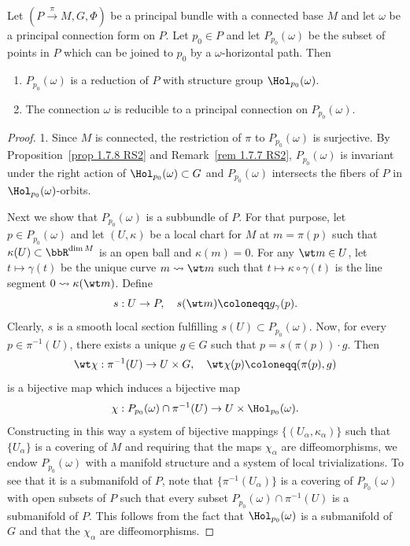 \begin{prop}[{{\cite[Prop.~1.7.12]{RS2}}}]\label{prop 1.7.12 RS2}
    Let $(P\overset{\pi}{\to}M,G,\Phi)$ be a principal bundle with a connected base $M$ and let $\omega$ be a principal connection form on $P$. Let $p_0\in P$ and let $P_{p_0}(\omega)$ be the subset of points in $P$ which can be joined to $p_0$ by a $\omega$-horizontal path. Then
    \begin{enumerate}
        \item $P_{p_0}(\omega)$ is a reduction of $P$ with structure group $\Hol_{p_0}(\omega)$.
        \item The connection $\omega$ is reducible to a principal connection on $P_{p_0}(\omega)$.
    \end{enumerate}
\end{prop}
\begin{proof}
    1. Since $M$ is connected, the restriction of $\pi$ to $P_{p_0}(\omega)$ is surjective. By Proposition~\ref{prop 1.7.8 RS2} and Remark~\ref{rem 1.7.7 RS2}, $P_{p_0}(\omega)$ is invariant under the right action of $\Hol_{p_0}(\omega)\subset G$ and $P_{p_0}(\omega)$ intersects the fibers of $P$ in $\Hol_{p_0}(\omega)$-orbits.

    Next we show that $P_{p_0}(\omega)$ is a subbundle of $P$. For that purpose, let $p\in P_{p_0}(\omega)$ and let $(U,\kappa)$ be a local chart for $M$ at $m=\pi(p)$ such that $\kappa(U)\subset\bbR^{\dim M}$ is an open ball and $\kappa(m)=0$. For any $\wt m\in U$, let $t\mapsto \gamma(t)$ be the unique curve  $m\leadsto \wt m$ such that $t\mapsto \kappa\circ\gamma(t)$ is the line segment $0\leadsto \kappa(\wt m)$. Define
    \[s:U\to P,\quad s(\wt m)\coloneqq g_{\gamma}(p).\]
    Clearly, $s$ is a smooth local section fulfilling $s(U)\subset P_{p_0}(\omega)$. Now, for every $p\in \pi^{-1}(U)$, there exists a unique $g\in G$ such that $p=s(\pi(p))\cdot g$. Then
    \[\wt\chi:\pi^{-1}(U)\to U\times G,\quad \wt\chi(p)\coloneqq (\pi(p),g)\]
    is a bijective map which induces a bijective map
    \[\chi:P_{p_0}(\omega)\cap\pi^{-1}(U)\to U\times \Hol_{p_0}(\omega).\]
    Constructing in this way a system of bijective mappings $\{(U_\alpha,\kappa_\alpha)\}$ such that $\{U_\alpha\}$ is a covering of $M$ and requiring that the maps $\chi_\alpha$ are diffeomorphisms, we endow $P_{p_0}(\omega)$ with a manifold structure and a system of local trivializations. To see that it is a submanifold of $P$, note that $\{\pi^{-1}(U_\alpha)\}$ is a covering of $P_{p_0}(\omega)$ with open subsets of $P$ such that every subset $P_{p_0}(\omega)\cap\pi^{-1}(U)$ is a submanifold of $P$. This follows from the fact that $\Hol_{p_0}(\omega)$ is a submanifold of $G$ and that the $\chi_\alpha$ are diffeomorphisms.


\end{proof}
